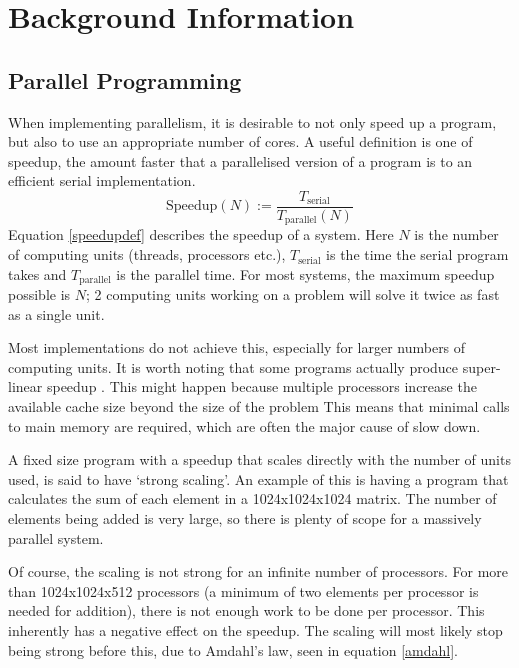 \documentclass[../main.tex]{subfiles}
\begin{document}
  \section{Background Information}
    \subsection{Parallel Programming}
    When implementing parallelism, it is desirable to not only speed up a program, but also to use an appropriate number of cores.
    A useful definition is one of speedup, the amount faster that a parallelised version of a program is to an efficient serial implementation.
    \begin{equation}
      \text{Speedup}(N) := \frac{T_\text{serial}}{T_\text{parallel}(N)}
      \label{speedupdef}
    \end{equation}
    Equation \ref{speedupdef} describes the speedup of a system.
    Here $N$ is the number of computing units (threads, processors etc.), $T_\text{serial}$ is the time the serial program takes and $T_\text{parallel}$ is the parallel time.
    For most systems, the maximum speedup possible is $N$; 2 computing units working on a problem will solve it twice as fast as a single unit. 

    Most implementations do not achieve this, especially for larger numbers of computing units.
    It is worth noting that some programs actually produce super-linear speedup \cite{superlinear}.
    This might happen because multiple processors increase the available cache size beyond the size of the problem
    This means that minimal calls to main memory are required, which are often the major cause of slow down.

    A fixed size program with a speedup that scales directly with the number of units used, is said to have `strong scaling'.
    An example of this is having a program that calculates the sum of each element in a 1024x1024x1024 matrix.
    The number of elements being added is very large, so there is plenty of scope for a massively parallel system.

    Of course, the scaling is not strong for an infinite number of processors.
    For more than 1024x1024x512 processors (a minimum of two elements per processor is needed for addition), there is not enough work to be done per processor.
    This inherently has a negative effect on the speedup.
    The scaling will most likely stop being strong before this, due to Amdahl's law, seen in equation \ref{amdahl}.
\end{document}

